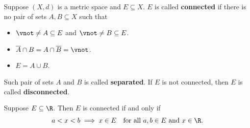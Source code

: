 \begin{definition} \label{an1:def:connected-set}
  Suppose $(X, d)$ is a metric space and $E \subseteq X$. $E$ is called \textbf{connected}
  if there is no pair of sets $A, B \subseteq X$ such that
  \begin{itemize}
    \item $\vnot \neq A \subseteq E$ and $\vnot \neq B \subseteq E$.
    \item $\overline{A} \cap B = A \cap \overline{B} = \vnot$.
    \item $E = A \cup B$.
  \end{itemize}
  Such pair of sets $A$ and $B$ is called \textbf{separated}.
  If $E$ is not connected, then $E$ is called \textbf{disconnected}.

\end{definition}

\begin{theorem} \label{an1:thm:connected-sets-in-R}
  Suppose $E \subseteq \R$. Then $E$ is connected if and only if
  \[
    a < x < b \implies x \in E \quad \text{for all } a, b \in E \text{ and } x \in \R.
  \]
\end{theorem}

